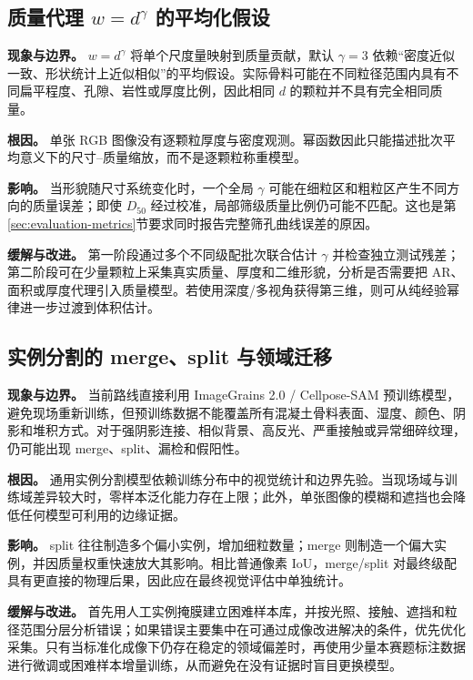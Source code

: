 \subsection{质量代理 $w=d^\gamma$ 的平均化假设}
\label{sec:limit-mass-proxy}

\textbf{现象与边界。} $w=d^\gamma$ 将单个尺度量映射到质量贡献，默认 $\gamma=3$ 依赖“密度近似一致、形状统计上近似相似”的平均假设。实际骨料可能在不同粒径范围内具有不同扁平程度、孔隙、岩性或厚度比例，因此相同 $d$ 的颗粒并不具有完全相同质量。

\textbf{根因。} 单张 RGB 图像没有逐颗粒厚度与密度观测。幂函数因此只能描述批次平均意义下的尺寸--质量缩放，而不是逐颗粒称重模型。

\textbf{影响。} 当形貌随尺寸系统变化时，一个全局 $\gamma$ 可能在细粒区和粗粒区产生不同方向的质量误差；即使 $D_{50}$ 经过校准，局部筛级质量比例仍可能不匹配。这也是第\ref{sec:evaluation-metrics}节要求同时报告完整筛孔曲线误差的原因。

\textbf{缓解与改进。} 第一阶段通过多个不同级配批次联合估计 $\gamma$ 并检查独立测试残差；第二阶段可在少量颗粒上采集真实质量、厚度和二维形貌，分析是否需要把 AR、面积或厚度代理引入质量模型。若使用深度/多视角获得第三维，则可从纯经验幂律进一步过渡到体积估计。

\subsection{实例分割的 merge、split 与领域迁移}
\label{sec:limit-segmentation}

\textbf{现象与边界。} 当前路线直接利用 ImageGrains 2.0 / Cellpose-SAM 预训练模型，避免现场重新训练，但预训练数据不能覆盖所有混凝土骨料表面、湿度、颜色、阴影和堆积方式。对于强阴影连接、相似背景、高反光、严重接触或异常细碎纹理，仍可能出现 merge、split、漏检和假阳性。

\textbf{根因。} 通用实例分割模型依赖训练分布中的视觉统计和边界先验。当现场域与训练域差异较大时，零样本泛化能力存在上限；此外，单张图像的模糊和遮挡也会降低任何模型可利用的边缘证据。

\textbf{影响。} split 往往制造多个偏小实例，增加细粒数量；merge 则制造一个偏大实例，并因质量权重快速放大其影响。相比普通像素 IoU，merge/split 对最终级配具有更直接的物理后果，因此应在最终视觉评估中单独统计。

\textbf{缓解与改进。} 首先用人工实例掩膜建立困难样本库，并按光照、接触、遮挡和粒径范围分层分析错误；如果错误主要集中在可通过成像改进解决的条件，优先优化采集。只有当标准化成像下仍存在稳定的领域偏差时，再使用少量本赛题标注数据进行微调或困难样本增量训练，从而避免在没有证据时盲目更换模型。

